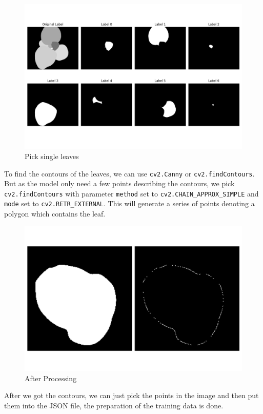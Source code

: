 \documentclass[conference]{IEEEtran}
\begin{document}
\begin{figure}[h!]
    \centering
    \includegraphics[width=\linewidth]{img/conversion_1.png}
    \caption{Pick single leaves}
    \label{fig_conversion_1}
\end{figure}
To find the contours of the leaves, we can use \verb|cv2.Canny| or \verb|cv2.findContours|. But as the model only need a few points describing the contours, we pick \verb|cv2.findContours| with parameter \verb|method| set to \verb|cv2.CHAIN_APPROX_SIMPLE| and \verb|mode| set to \verb|cv2.RETR_EXTERNAL|. This will generate a series of points denoting a polygon which contains the leaf. 

\begin{figure}[h!]
    \centering
    \includegraphics[width=0.75\linewidth]{img/conversion_2_label_2_scaled_up.png}
    \caption{After Processing }
    \label{fig_conversion_2}
\end{figure}
After we got the contours, we can just pick the points in the image and then put them into the JSON file, the preparation of the training data is done.
\end{document}
